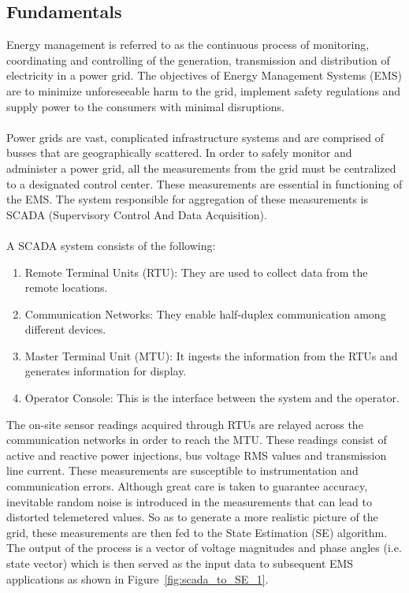 \documentclass[thesis.tex]{subfiles}
\begin{document}
\subsection{Fundamentals}\label{subsec:fundamentals} 
Energy management is referred to as the continuous process of monitoring, coordinating and controlling of the generation, transmission and distribution of electricity in a power grid. The objectives of Energy Management Systems (EMS) are to minimize unforeseeable harm to the grid, implement safety regulations and supply power to the consumers with minimal disruptions.\\\\
Power grids are vast, complicated infrastructure systems and are comprised of busses that are geographically scattered. In order to safely monitor and administer a power grid, all the measurements from the grid must be centralized to a designated control center. These measurements are essential in functioning of the EMS. The system responsible for aggregation of these measurements is SCADA (Supervisory Control And Data Acquisition). \\\\
A SCADA system consists of the following:
\begin{enumerate}
	\item Remote Terminal Units (RTU): They are used to collect data from the remote locations.
	\item Communication Networks: They enable half-duplex communication among different devices.
	\item Master Terminal Unit (MTU): It ingests the information from the RTUs and generates information for display.
	\item Operator Console: This is the interface between the system and the operator.
\end{enumerate}
The on-site sensor readings acquired through RTUs are relayed across the communication networks in order to reach the MTU. These readings consist of active and reactive power injections, bus voltage RMS values and transmission line current. These measurements are susceptible to instrumentation and communication errors. Although great care is taken to guarantee accuracy, inevitable random noise is introduced in the measurements that can lead to distorted telemetered values. So as to generate a more realistic picture of the grid, these measurements are then fed to the State Estimation (SE) algorithm. The output of the process is a vector of voltage magnitudes and phase angles (i.e. state vector) which is then served as the input data to subsequent EMS applications as shown in Figure~\ref{fig:scada_to_SE_1}.\\\\
\end{document}
